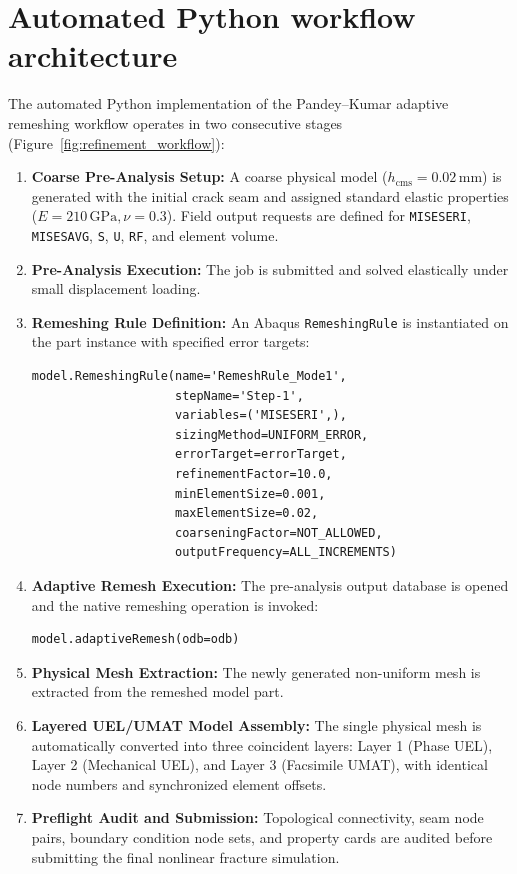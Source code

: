 \section{Automated Python workflow architecture}
The automated Python implementation of the Pandey--Kumar adaptive remeshing workflow operates in two consecutive stages (Figure~\ref{fig:refinement_workflow}):
\begin{enumerate}[label=\textbf{Step \arabic*:},leftmargin=18mm]
  \item \textbf{Coarse Pre-Analysis Setup:} A coarse physical model ($h_{\mathrm{cms}} = 0.02\,\mathrm{mm}$) is generated with the initial crack seam and assigned standard elastic properties ($E = 210\,\mathrm{GPa}, \nu = 0.3$). Field output requests are defined for \texttt{MISESERI}, \texttt{MISESAVG}, \texttt{S}, \texttt{U}, \texttt{RF}, and element volume.
  \item \textbf{Pre-Analysis Execution:} The job is submitted and solved elastically under small displacement loading.
  \item \textbf{Remeshing Rule Definition:} An Abaqus \texttt{RemeshingRule} is instantiated on the part instance with specified error targets:
\begin{verbatim}
model.RemeshingRule(name='RemeshRule_Mode1',
                    stepName='Step-1',
                    variables=('MISESERI',),
                    sizingMethod=UNIFORM_ERROR,
                    errorTarget=errorTarget,
                    refinementFactor=10.0,
                    minElementSize=0.001,
                    maxElementSize=0.02,
                    coarseningFactor=NOT_ALLOWED,
                    outputFrequency=ALL_INCREMENTS)
\end{verbatim}
  \item \textbf{Adaptive Remesh Execution:} The pre-analysis output database is opened and the native remeshing operation is invoked:
\begin{verbatim}
model.adaptiveRemesh(odb=odb)
\end{verbatim}
  \item \textbf{Physical Mesh Extraction:} The newly generated non-uniform mesh is extracted from the remeshed model part.
  \item \textbf{Layered UEL/UMAT Model Assembly:} The single physical mesh is automatically converted into three coincident layers: Layer 1 (Phase UEL), Layer 2 (Mechanical UEL), and Layer 3 (Facsimile UMAT), with identical node numbers and synchronized element offsets.
  \item \textbf{Preflight Audit and Submission:} Topological connectivity, seam node pairs, boundary condition node sets, and property cards are audited before submitting the final nonlinear fracture simulation.
\end{enumerate}


